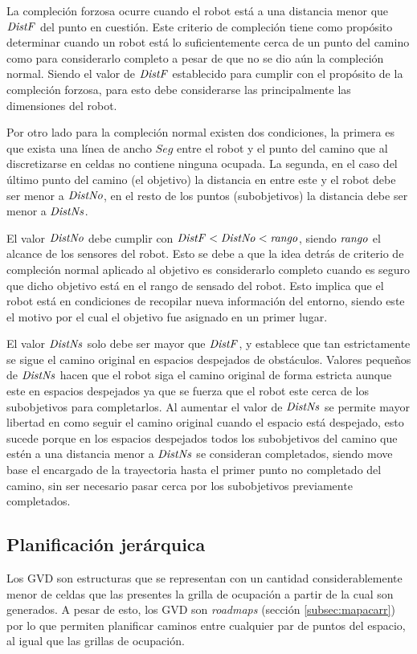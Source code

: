 La compleción forzosa ocurre cuando el robot está a una distancia menor que
$\mathit{DistF}$ del punto en cuestión. Este criterio de compleción tiene como
propósito determinar cuando un robot está lo suficientemente cerca de un
punto del camino como para considerarlo completo a pesar de que no se dio
aún la compleción normal. Siendo el valor de $\mathit{DistF}$ establecido para
cumplir con el propósito de la compleción forzosa, para esto debe considerarse
las principalmente las dimensiones del robot.

Por otro lado para la compleción normal existen dos condiciones, la primera es
que exista una línea de ancho $Seg$ entre el robot y el punto del camino que al
discretizarse en celdas no contiene ninguna ocupada. La segunda, en el caso del
último punto del camino (el objetivo) la distancia en entre este y el robot
debe ser menor a $\mathit{DistNo}$, en el resto de los puntos (subobjetivos) la distancia debe
ser menor a $\mathit{DistNs}$.

El valor $\mathit{DistNo}$ debe cumplir con
$\mathit{DistF}<\mathit{DistNo}<\mathit{rango}$, siendo $\mathit{rango}$ el alcance de los
sensores del robot. Esto se debe a que la idea detrás de criterio de compleción
normal aplicado al objetivo es considerarlo completo cuando es seguro que dicho objetivo
está en el rango de sensado del robot. Esto implica que el robot está en
condiciones de recopilar nueva información del entorno, siendo este el motivo
por el cual el objetivo fue asignado en un primer lugar.

El valor $\mathit{DistNs}$ solo debe ser mayor que $\mathit{DistF}$, y establece que
tan estrictamente se sigue el camino original en espacios despejados de
obstáculos. Valores pequeños de $\mathit{DistNs}$ hacen que el robot siga el
camino original de forma estricta aunque este en espacios despejados ya que se 
fuerza que el robot este cerca de los subobjetivos para completarlos. Al
aumentar el valor de $\mathit{DistNs}$ se permite mayor libertad en como seguir el
camino original cuando el espacio está despejado, esto sucede porque en los
espacios despejados todos los subobjetivos del camino que estén a una
distancia menor a $\mathit{DistNs}$ se consideran completados, siendo move base el
encargado de la trayectoria hasta el primer punto no completado del camino,
sin ser necesario pasar cerca por los subobjetivos previamente completados.

\subsection{Planificación jerárquica}
Los GVD son estructuras que se representan con un cantidad considerablemente
menor de celdas que las presentes la grilla de ocupación a partir de la cual son
generados. A pesar de esto, los GVD son \emph{roadmaps} (sección
\ref{subsec:mapacarr}) por lo que permiten planificar caminos entre cualquier par de
puntos del espacio, al igual que las grillas de ocupación. 

